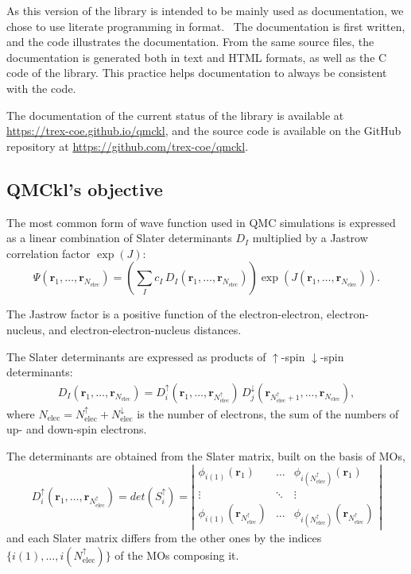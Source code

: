 As this version of the library is intended to be mainly used as documentation, 
we chose to use literate programming\cite{knuth_1992} in {\orgmode}
format.~\cite{schulte_2012,orgmode} The documentation
is first written, and the code illustrates the documentation. From the same source files,
the documentation is generated both in text and HTML formats, as well as the C code of the library.
This practice helps documentation to always be consistent with the code.

The documentation of the current status of the library is available
at \url{https://trex-coe.github.io/qmckl}, and the source code is
available on the GitHub repository at \url{https://github.com/trex-coe/qmckl}.

\subsection{QMCkl's objective}

\newcommand{\Nelec}{N_{\text{elec}}}
\newcommand{\Nelecup}{N_{\text{elec}}^\uparrow}
\newcommand{\Nelecdn}{N_{\text{elec}}^\downarrow}
\newcommand{\br}{\mathbf{r}_1,\dots,\mathbf{r}_{\Nelec}}
\newcommand{\brup}{\mathbf{r}_1,\dots,\mathbf{r}_{\Nelec^\uparrow}}
\newcommand{\brdn}{\mathbf{r}_{\Nelec^\uparrow+1},\dots,\mathbf{r}_{\Nelec}}

The most common form of wave function used in \ac{QMC} simulations is
expressed as a linear combination of Slater determinants $D_I$ multiplied by
a Jastrow correlation factor $\exp(J)$:
\begin{equation}
  \Psi(\br) = \left( \sum_I c_I\, D_I(\br) \right) \exp \left( J(\br) \right).
\end{equation}

The Jastrow factor is a positive function of the electron-electron,
electron-nucleus, and electron-electron-nucleus distances. 

The Slater determinants are expressed as products of $\uparrow$-spin
$\downarrow$-spin determinants:
\begin{eqnarray}
D_I(\br) = D_i^\uparrow(\brup)\, D_j^\downarrow(\brdn),
\end{eqnarray}
where $\Nelec = \Nelecup + \Nelecdn$ is the number of
electrons, the sum of the numbers of up- and down-spin electrons.

The determinants are obtained from the Slater matrix, built on the basis of \acp{MO},
\begin{equation}
  D_i^\uparrow(\brup) = det(S_i^\uparrow) = \left|
    \begin{array}{ccc}
      \phi_{i(1)}(\mathbf{r}_1) & \dots & \phi_{i(\Nelecup)}(\mathbf{r}_1) \\
        \vdots & \ddots & \vdots \\
      \phi_{i(1)}(\mathbf{r}_{\Nelecup}) & \dots & \phi_{i(\Nelecup)}(\mathbf{r}_{\Nelecup}) 
    \end{array}
    \right|
\end{equation}
and each Slater matrix differs from the other ones by the indices $\{
i(1), \dots, i(\Nelecup) \}$ of the \acp{MO} composing it.

